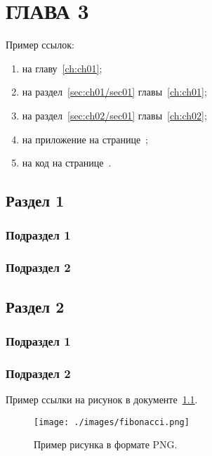\chapter{\label{ch:ch03}ГЛАВА 3}

Пример ссылок:
\begin{enumerate}
\item на главу~\ref{ch:ch01};
\item на раздел~\ref{sec:ch01/sec01} главы~\ref{ch:ch01};
\item на раздел~\ref{sec:ch02/sec01} главы~\ref{ch:ch02};
\item на приложение на странице~\pageref{appendix1};
\item на код на странице~\pageref{code:pi-example}.
\end{enumerate}

\section{\label{sec:ch03/sec01}Раздел 1}

\subsection{\label{subsec:ch03/sec01/sub01}Подраздел 1}

\subsection{\label{subsec:ch03/sec01/sub02}Подраздел 2}

\section{\label{sec:ch03/sec02}Раздел 2}

\subsection{\label{subsec:ch03/sec02/sub01}Подраздел 1}

\subsection{\label{subsec:ch03/sec02/sub02}Подраздел 2}

Пример ссылки на рисунок в документе~\ref{fig:example05}.
\begin{figure}[h]
    \centering
    \texttt{[image: ./images/fibonacci.png]}
    \caption{\centering\label{fig:example05}Пример рисунка в формате PNG.}
\end{figure}


